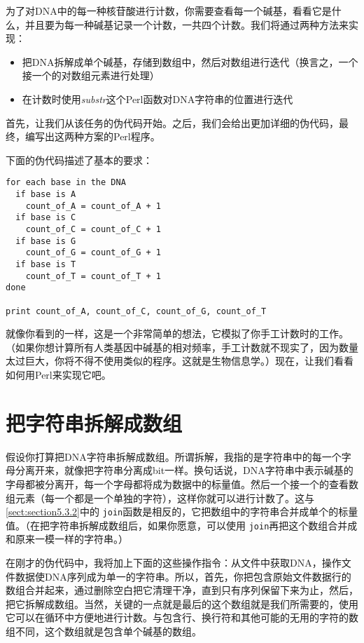 为了对DNA中的每一种核苷酸进行计数，你需要查看每一个碱基，看看它是什么，并且要为每一种碱基记录一个计数，一共四个计数。我们将通过两种方法来实现：

\begin{itemize}
  \item 把DNA拆解成单个碱基，存储到数组中，然后对数组进行迭代（换言之，一个接一个的对数组元素进行处理）
  \item 在计数时使用\textit{substr}这个Perl函数对DNA字符串的位置进行迭代
\end{itemize}

首先，让我们从该任务的伪代码开始。之后，我们会给出更加详细的伪代码，最终，编写出这两种方案的Perl程序。

下面的伪代码描述了基本的要求：

\begin{lstlisting}
for each base in the DNA
  if base is A
    count_of_A = count_of_A + 1
  if base is C
    count_of_C = count_of_C + 1
  if base is G
    count_of_G = count_of_G + 1
  if base is T
    count_of_T = count_of_T + 1
done

print count_of_A, count_of_C, count_of_G, count_of_T
\end{lstlisting}

就像你看到的一样，这是一个非常简单的想法，它模拟了你手工计数时的工作。（如果你想计算所有人类基因中碱基的相对频率，手工计数就不现实了，因为数量太过巨大，你将不得不使用类似的程序。这就是生物信息学。）现在，让我们看看如何用Perl来实现它吧。

\section{把字符串拆解成数组}
假设你打算把DNA字符串拆解成数组。所谓拆解，我指的是字符串中的每一个字母分离开来，就像把字符串分离成bit一样。换句话说，DNA字符串中表示碱基的字母都被分离开，每一个字母都将成为数据中的标量值。然后一个接一个的查看数组元素（每一个都是一个单独的字符），这样你就可以进行计数了。这与\autoref{sect:section5.3.2}中的 \verb|join|函数是相反的，它把数组中的字符串合并成单个的标量值。（在把字符串拆解成数组后，如果你愿意，可以使用 \verb|join|再把这个数组合并成和原来一模一样的字符串。）

在刚才的伪代码中，我将加上下面的这些操作指令：从文件中获取DNA，操作文件数据使DNA序列成为单一的字符串。所以，首先，你把包含原始文件数据行的数组合并起来，通过删除空白把它清理干净，直到只有序列保留下来为止，然后，把它拆解成数组。当然，关键的一点就是最后的这个数组就是我们所需要的，使用它可以在循环中方便地进行计数。与包含行、换行符和其他可能的无用的字符的数组不同，这个数组就是包含单个碱基的数组。

